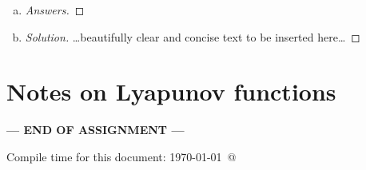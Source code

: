 \documentclass[12pt]{article}
\begin{document}
\begin{enumerate}[(a)]
\begin{enumerate}[(i)]
{\begin{proof}[Solution]
\end{proof}
}
  
  
  \item \basicSIRanalQbiv
{\color{blue}
\begin{proof}[Solution]
	
	Yes it is possible to find an exact analytical expression for t(S). The same steps from part (i) can be taken, except R is solved for as a function of S (separable equation) when combining $dS/dt$ and $dR/dt$, and the $dS/dt$ equation is solved for I to achieve a relation between $dS/dt$ and I to substitute into the$ S+I+R=1$ equation. Carrying on as in part (i) R and I can now be replaced in $S+I+R=1$ and the equation can be solved as a separable equation, giving t as a function of S or t(S).

\end{proof}
}  
  
  \end{enumerate}
\item \basicSIRanalQc

{\color{blue}
\begin{proof}[Answers]

\end{proof}
}


\item \basicSIRanalQd

{\color{blue}
\begin{proof}[Solution]
{\color{magenta}\dots beautifully clear and concise text to be inserted here\dots}
\end{proof}
}

\end{enumerate}

\newpage
\section*{Notes on Lyapunov functions}\hypertarget{NotesLyapFuns}{}

\NotesOnLyapunovFunctions




\bigskip

\centerline{\bf--- END OF ASSIGNMENT ---}

\bigskip
Compile time for this document:
\today\ @ \thistime
\end{document}
